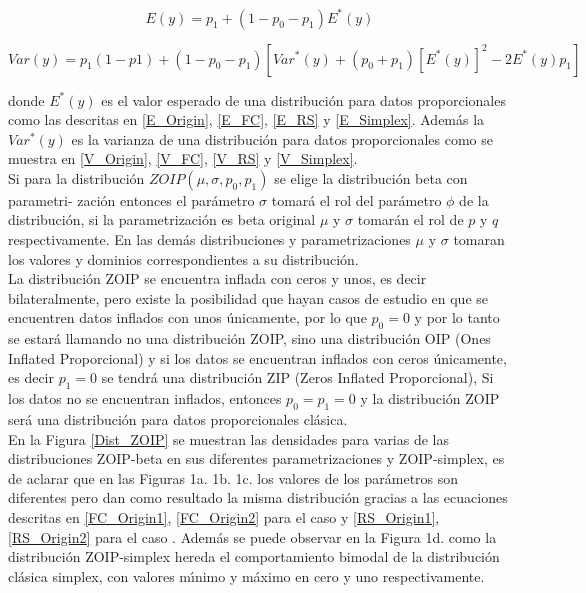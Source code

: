\begin{equation}
	E(y) = p_1+(1-p_0-p_1)E^*(y)
\end{equation}

\begin{equation}
	Var(y) = p_1(1-p1)+(1-p_0-p_1)\left[Var^*(y)+(p_0+p_1)[E^*(y)]^2-2E^*(y)p_1\right]
\end{equation}

donde $E^*(y)$ es el valor esperado de una distribuci\'{o}n para datos proporcionales como las descritas en \eqref{E_Origin}, \eqref{E_FC}, \eqref{E_RS} y \eqref{E_Simplex}. Adem\'{a}s la $Var^*(y)$ es la varianza de una distribuci\'{o}n para datos proporcionales como se muestra en \eqref{V_Origin}, \eqref{V_FC}, \eqref{V_RS} y \eqref{V_Simplex}.\\

Si para la distribuci\'{o}n $ZOIP(\mu, \sigma, p_0, p_1)$ se elige la distribuci\'{o}n beta con parametri- zaci\'{o}n \cite{Ferrari2} entonces el par\'{a}metro $\sigma$ tomar\'{a} el rol del par\'{a}metro $\phi$ de la distribuci\'{o}n, si la parametrizaci\'{o}n es beta original $\mu$ y $\sigma$ tomar\'{a}n el rol de $p$ y $q$ respectivamente. En las dem\'{a}s distribuciones y parametrizaciones $\mu$ y $\sigma$ tomaran los valores y dominios correspondientes a su distribuci\'{o}n.\\

La distribuci\'{o}n ZOIP se encuentra inflada con ceros y unos, es decir bilateralmente, pero existe la posibilidad que hayan casos de estudio en que se encuentren datos inflados con unos \'{u}nicamente, por lo que $p_0=0$ y por lo tanto se estar\'{a} llamando no una distribuci\'{o}n ZOIP, sino una distribuci\'{o}n OIP (Ones Inflated Proporcional) y si los datos se encuentran inflados con ceros \'{u}nicamente, es decir $p_1=0$ se tendr\'{a} una distribuci\'{o}n ZIP (Zeros Inflated Proporcional), Si los datos no se encuentran inflados, entonces $p_0=p_1=0$ y la distribuci\'{o}n ZOIP ser\'{a} una distribuci\'{o}n para datos proporcionales cl\'{a}sica.\\

En la Figura \ref{Dist_ZOIP} se muestran las densidades para varias de las distribuciones ZOIP-beta en sus diferentes parametrizaciones y ZOIP-simplex, es de aclarar que en las Figuras 1a. 1b. 1c. los valores de los par\'{a}metros son diferentes pero dan como resultado la misma distribuci\'{o}n gracias a las ecuaciones descritas en \eqref{FC_Origin1}, \eqref{FC_Origin2} para el caso \cite{Ferrari2} y \eqref{RS_Origin1}, \eqref{RS_Origin2} para el caso \cite{Stasinopoulos2}. Adem\'{a}s se puede observar en la Figura 1d. como la distribuci\'{o}n ZOIP-simplex hereda el comportamiento bimodal de la distribuci\'{o}n cl\'{a}sica simplex, con valores m\'{\i}nimo y m\'{a}ximo en cero y uno respectivamente. 

